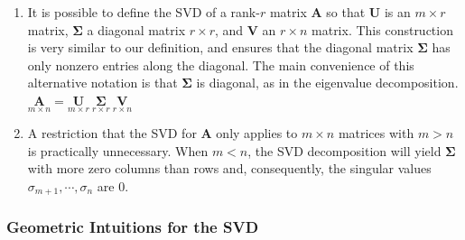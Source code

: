 \begin{enumerate}
    \item
    \begin{definition}[Compact SVD/ Thin SVD/ Truncated SVD ($A = U\Sigma V$)]
        It is possible to define the SVD of a rank-$r$ matrix $\bm{A}$ so that $\bm{U}$ is an $m \times r$ matrix, $\bm{\Sigma}$ a diagonal matrix $r \times r$, and $\bm{V}$ an $r \times n$ matrix.
        This construction is very similar to our definition, and ensures that the diagonal matrix $\bm{\Sigma}$ has only nonzero entries along the diagonal.
        The main convenience of this alternative notation is that $\bm{\Sigma}$ is diagonal, as in the eigenvalue decomposition.
        \\
         $
            \underset{\displaystyle m\times n}{\bm{A}} =
            \underset{\displaystyle m\times r}{\bm{U}}\
            \underset{\displaystyle r\times r}{\bm{\Sigma}}\
            \underset{\displaystyle r\times n}{\bm{V}}
        $
        \hfill \cite{mfml/book/mml/Deisenroth-Faisal-Ong}
    \end{definition}

    \item A restriction that the SVD for $\bm{A}$ only applies to $m \times n$ matrices with $m > n$ is practically unnecessary.
    When $m < n$, the SVD decomposition will yield $\bm{\Sigma}$ with more zero columns than rows and, consequently, the singular values $\sigma _{m+1}, \cdots , \sigma _n$ are $0$.
    \hfill \cite{mfml/book/mml/Deisenroth-Faisal-Ong}
\end{enumerate}





\subsubsection{Geometric Intuitions for the SVD}

